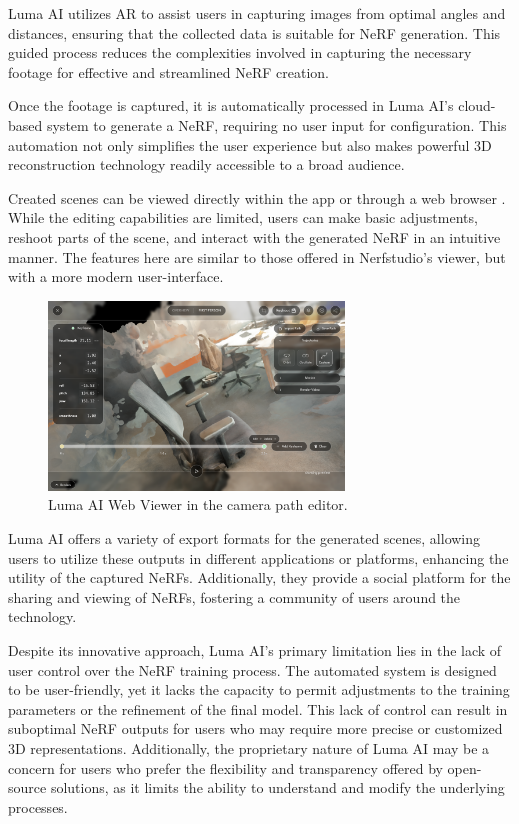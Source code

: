 Luma AI utilizes AR to assist users in capturing images from optimal angles and distances, ensuring that the collected data is suitable for NeRF generation.
This guided process reduces the complexities involved in capturing the necessary footage for effective and streamlined NeRF creation.

Once the footage is captured, it is automatically processed in Luma AI’s cloud-based system to generate a NeRF, requiring no user input for configuration.
This automation not only simplifies the user experience but also makes powerful 3D reconstruction technology readily accessible to a broad audience.

Created scenes can be viewed directly within the app or through a web browser . 
While the editing capabilities are limited, users can make basic adjustments, reshoot parts of the scene, and interact with the generated NeRF in an intuitive manner.
The features here are similar to those offered in Nerfstudio's viewer, but with a more modern user-interface.

\begin{figure}[h!]
  \centering
  \includegraphics[width=0.7\textwidth]{figures/related-luma.png}
  \caption{Luma AI Web Viewer in the camera path editor.}
  \label{fig:luma-viewer}
\end{figure}

Luma AI offers a variety of export formats for the generated scenes, allowing users to utilize these outputs in different applications or platforms, enhancing the utility of the captured NeRFs.
Additionally, they provide a social platform for the sharing and viewing of NeRFs, fostering a community of users around the technology.

Despite its innovative approach, Luma AI's primary limitation lies in the lack of user control over the NeRF training process.
The automated system is designed to be user-friendly, yet it lacks the capacity to permit adjustments to the training parameters or the refinement of the final model.
This lack of control can result in suboptimal NeRF outputs for users who may require more precise or customized 3D representations.
Additionally, the proprietary nature of Luma AI may be a concern for users who prefer the flexibility and transparency offered by open-source solutions, as it limits the ability to understand and modify the underlying processes.


